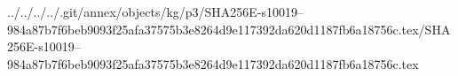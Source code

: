 ../../../../.git/annex/objects/kg/p3/SHA256E-s10019--984a87b7f6beb9093f25afa37575b3e8264d9e117392da620d1187fb6a18756c.tex/SHA256E-s10019--984a87b7f6beb9093f25afa37575b3e8264d9e117392da620d1187fb6a18756c.tex